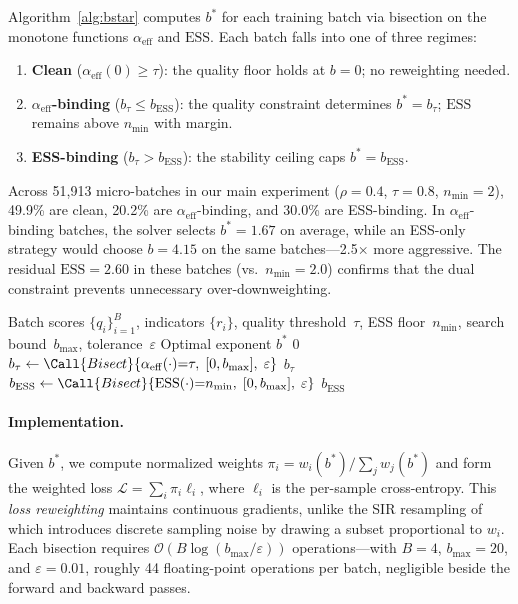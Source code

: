 Algorithm~\ref{alg:bstar} computes $b^{*}$ for each training batch via bisection on the monotone functions $\alpha_{\mathrm{eff}}$ and $\mathrm{ESS}$.
Each batch falls into one of three regimes:
\begin{enumerate}[nosep,leftmargin=*]
  \item \textbf{Clean} ($\alpha_{\mathrm{eff}}(0) \geq \tau$): the quality floor holds at $b = 0$; no reweighting needed.
  \item \textbf{$\alpha_{\mathrm{eff}}$-binding} ($b_\tau \leq b_{\mathrm{ESS}}$): the quality constraint determines $b^{*} = b_\tau$; $\mathrm{ESS}$ remains above $n_{\min}$ with margin.
  \item \textbf{ESS-binding} ($b_\tau > b_{\mathrm{ESS}}$): the stability ceiling caps $b^{*} = b_{\mathrm{ESS}}$.
\end{enumerate}
Across 51{,}913 micro-batches in our main experiment ($\rho{=}0.4$, $\tau{=}0.8$, $n_{\min}{=}2$), 49.9\% are clean, 20.2\% are $\alpha_{\mathrm{eff}}$-binding, and 30.0\% are ESS-binding.
In $\alpha_{\mathrm{eff}}$-binding batches, the solver selects $b^{*} = 1.67$ on average, while an ESS-only strategy would choose $b = 4.15$ on the same batches---2.5$\times$ more aggressive.
The residual $\mathrm{ESS} = 2.60$ in these batches (vs.\ $n_{\min} = 2.0$) confirms that the dual constraint prevents unnecessary over-downweighting.

\begin{algorithm}[t]
\caption{Per-batch adaptive $b^{*}$ selection}
\label{alg:bstar}
\begin{algorithmic}[1]
\Require Batch scores $\{q_i\}_{i=1}^{B}$, indicators $\{r_i\}$, quality threshold~$\tau$, ESS floor~$n_{\min}$, search bound~$b_{\max}$, tolerance~$\varepsilon$
\Ensure Optimal exponent $b^{*}$
  \State \Return $0$ 
\EndIf
\State $b_\tau \gets \Call{Bisect}{\alpha_{\mathrm{eff}}(\cdot){=}\tau,\; [0, b_{\max}],\; \varepsilon}$
  \State \Return $b_\tau$ 
\Else
  \State $b_{\mathrm{ESS}} \gets \Call{Bisect}{\mathrm{ESS}(\cdot){=}n_{\min},\; [0, b_{\max}],\; \varepsilon}$
  \State \Return $b_{\mathrm{ESS}}$ 
\EndIf
\end{algorithmic}
\end{algorithm}

\paragraph{Implementation.}
Given $b^{*}$, we compute normalized weights $\pi_i = w_i(b^{*}) / \sum_j w_j(b^{*})$ and form the weighted loss $\mathcal{L} = \sum_i \pi_i \ell_i$, where $\ell_i$ is the per-sample cross-entropy.
This \emph{loss reweighting} maintains continuous gradients, unlike the SIR resampling of \citet{drayson_2025_detection_collapse} which introduces discrete sampling noise by drawing a subset proportional to $w_i$.
Each bisection requires $\mathcal{O}(B \log(b_{\max}/\varepsilon))$ operations---with $B{=}4$, $b_{\max}{=}20$, and $\varepsilon{=}0.01$, roughly 44 floating-point operations per batch, negligible beside the forward and backward passes.

